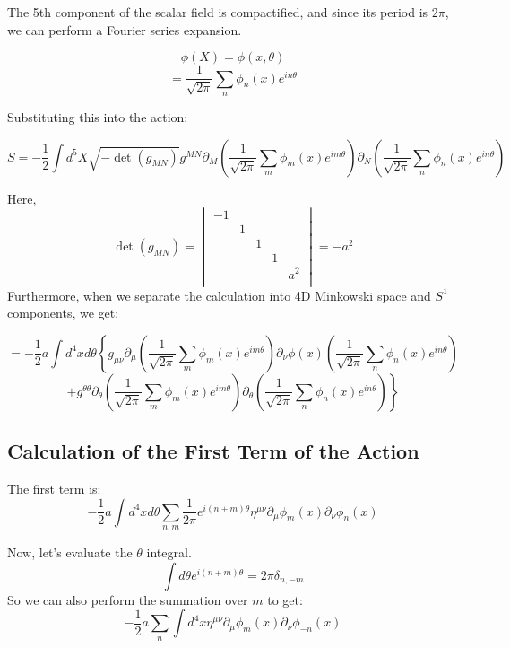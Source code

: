\documentclass{article}
\begin{document}
The 5th component of the scalar field is compactified, and since its period is $2 \pi$, we can perform a Fourier series expansion.

$$
	\phi(X)
	=
	\phi(x,\theta)
$$
$$
	=
	\dfrac{1}{
		\sqrt{ 2 \pi}
	}
	\sum_{n}
	\phi_{n}(x)
	e^{i n \theta}
$$

Substituting this into the action:

$$
	S
	=
	- \dfrac{1}{2}
	\int d^{5} X
	\sqrt{ - \det(g_{MN}) }
	g^{MN}
	\partial_{M}
	\left(
	\dfrac{1}{
		\sqrt{ 2 \pi}
	}
	\sum_{m}
	\phi_{m}(x)
	e^{i m \theta}
	\right)
	\partial_{N}
	\left(
	\dfrac{1}{
		\sqrt{ 2 \pi}
	}
	\sum_{n}
	\phi_{n}(x)
	e^{i n \theta}
	\right)
$$

Here,
$$
	\det(g_{MN})
	=
	\begin{vmatrix}
		-1 &   &   &   &       \\
		   & 1 &   &   &       \\
		   &   & 1 &   &       \\
		   &   &   & 1 &       \\
		   &   &   &   & a^{2} \\
	\end{vmatrix}
	=
	- a^{2}
$$
Furthermore, when we separate the calculation into 4D Minkowski space and $S^{1}$ components, we get:

$$
	=
	- \dfrac{1}{2}
	a
	\int d^{4} x d \theta
	\left\{
	g_{\mu \nu}
	\partial_{\mu}
	\left(
	\dfrac{1}{
		\sqrt{ 2 \pi}
	}
	\sum_{m}
	\phi_{m}(x)
	e^{i m \theta}
	\right)
	\partial_{\nu}
	\phi(x)
	\left(
	\dfrac{1}{
		\sqrt{ 2 \pi}
	}
	\sum_{n}
	\phi_{n}(x)
	e^{i n \theta}
	\right)
	\right.
$$
$$
	\left.
	+
	g^{\theta \theta}
	\partial_{\theta}
	\left(
	\dfrac{1}{
		\sqrt{ 2 \pi}
	}
	\sum_{m}
	\phi_{m}(x)
	e^{i m \theta}
	\right)
	\partial_{\theta}
	\left(
	\dfrac{1}{
		\sqrt{ 2 \pi}
	}
	\sum_{n}
	\phi_{n}(x)
	e^{i n \theta}
	\right)
	\right\}
$$

\subsection{Calculation of the First Term of the Action}

The first term is:
$$
	- \dfrac{1}{2}
	a
	\int d^{4} x d \theta
	\sum_{n,m}
	\dfrac{1}{2 \pi}
	e^{i (n+m) \theta}
	\eta^{\mu \nu}
	\partial_{\mu}
	\phi_{m}(x)
	\partial_{\nu}
	\phi_{n}(x)
$$

Now, let's evaluate the $\theta$ integral.
$$
	\int d \theta
	e^{i (n+m) \theta}
	=
	2 \pi
	\delta_{n,-m}
$$
So we can also perform the summation over $m$ to get:
$$
	- \dfrac{1}{2}
	a
	\sum_{n}
	\int d^{4} x
	\eta^{\mu \nu}
	\partial_{\mu}
	\phi_{m}(x)
	\partial_{\nu}
	\phi_{-n}(x)
$$
\end{document}
